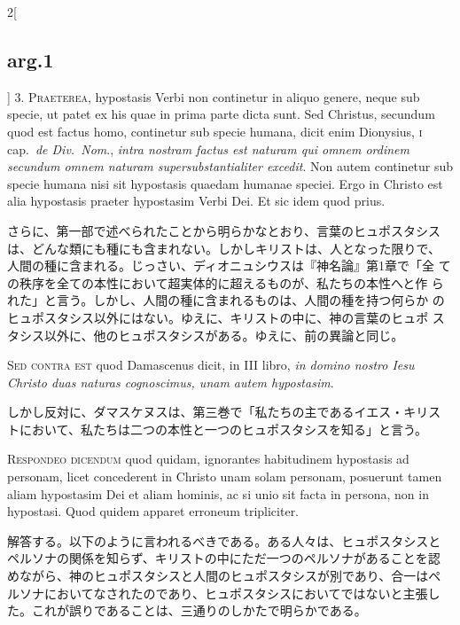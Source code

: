 \documentclass[paper=a4paper,fontsize=10pt,jafontsize=9pt,titlepage]{jlreq}
\begin{document}
\begin{paracol}{2}[\subsection{arg.1}]
3. {\scshape Praeterea}, hypostasis Verbi non continetur in aliquo
genere, neque sub specie, ut patet ex his quae in prima parte dicta
sunt. Sed Christus, secundum quod est factus homo, continetur sub
specie humana, dicit enim Dionysius, {\scshape i} cap.~{\itshape de
Div.~Nom}., {\itshape intra nostram factus est naturam qui omnem
ordinem secundum omnem naturam supersubstantialiter excedit}. Non
autem continetur sub specie humana nisi sit hypostasis quaedam humanae
speciei. Ergo in Christo est alia hypostasis praeter hypostasim Verbi
Dei. Et sic idem quod prius.

\switchcolumn

さらに、第一部で述べられたことから明らかなとおり、言葉のヒュポスタシス
は、どんな類にも種にも含まれない。しかしキリストは、人となった限りで、
人間の種に含まれる。じっさい、ディオニュシウスは『神名論』第1章で「全
ての秩序を全ての本性において超実体的に超えるものが、私たちの本性へと作
られた」と言う。しかし、人間の種に含まれるものは、人間の種を持つ何らか
のヒュポスタシス以外にはない。ゆえに、キリストの中に、神の言葉のヒュポ
スタシス以外に、他のヒュポスタシスがある。ゆえに、前の異論と同じ。

\switchcolumn*[\subsection{s.c.}]

{\scshape Sed contra est} quod Damascenus dicit, in III libro,
{\itshape in domino nostro Iesu Christo duas naturas cognoscimus, unam
autem hypostasim}.

\switchcolumn

しかし反対に、ダマスケヌスは、第三巻で「私たちの主であるイエス・キリス
トにおいて、私たちは二つの本性と一つのヒュポスタシスを知る」と言う。


{\scshape Respondeo dicendum} quod quidam, ignorantes habitudinem
hypostasis ad personam, licet concederent in Christo unam solam
personam, posuerunt tamen aliam hypostasim Dei et aliam hominis, ac si
unio sit facta in persona, non in hypostasi. Quod quidem apparet
erroneum tripliciter.

\switchcolumn

解答する。以下のように言われるべきである。ある人々は、ヒュポスタシスと
ペルソナの関係を知らず、キリストの中にただ一つのペルソナがあることを認
めながら、神のヒュポスタシスと人間のヒュポスタシスが別であり、合一はペ
ルソナにおいてなされたのであり、ヒュポスタシスにおいてではないと主張し
た。これが誤りであることは、三通りのしかたで明らかである。


\end{paracol}
\end{document}
